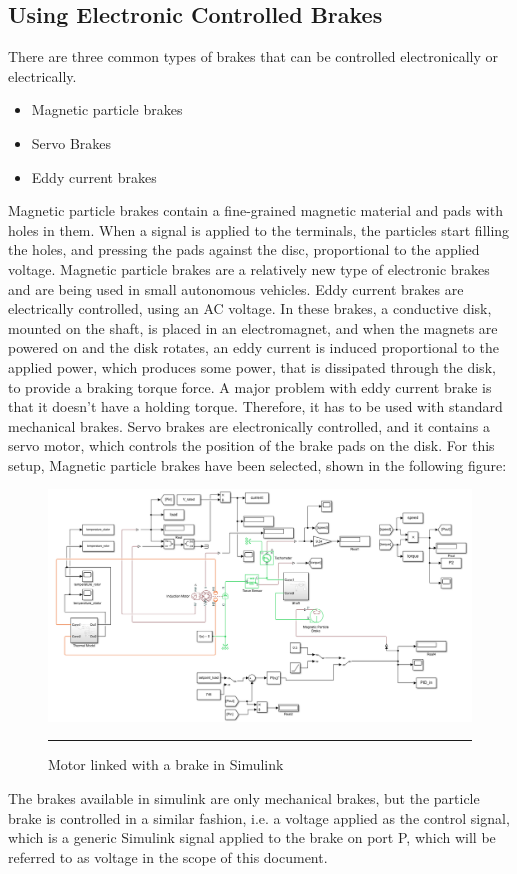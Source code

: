 \subsection{Using Electronic Controlled Brakes}
There are three common types of brakes that can be controlled electronically or electrically. 
\begin{itemize}
	\item	Magnetic particle brakes
	\item	Servo Brakes
	\item	Eddy current brakes
\end{itemize}
Magnetic particle brakes contain a fine-grained magnetic material and pads with holes in them. When a signal is applied to the terminals, the particles start filling the holes, and pressing the pads against the disc, proportional to the applied voltage. Magnetic particle brakes are a relatively new type of electronic brakes and are being used in small autonomous vehicles.
Eddy current brakes are electrically controlled, using an AC voltage. In these brakes, a conductive disk, mounted on the shaft, is placed in an electromagnet, and when the magnets are powered on and the disk rotates, an eddy current is induced proportional to the applied power, which produces some power, that is dissipated through the disk, to provide a braking torque force.  A major problem with eddy current brake is that it doesn’t have a holding torque. Therefore, it has to be used with standard mechanical brakes.
Servo brakes are electronically controlled, and it contains a servo motor, which controls the position of the brake pads on the disk. 
For this setup, Magnetic particle brakes have been selected, shown in the following figure:
\begin{figure}[htbp]
	\centering
		\includegraphics[width = 4.5in]{./Figures/MS/fig321.png}
		\rule{35em}{0.5pt}
	\caption{Motor linked with a brake in Simulink}
	\label{fig:Motor linked with a brake in Simulink}
\end{figure}
The brakes available in simulink are only mechanical brakes, but the particle brake is controlled in a similar fashion, i.e. a voltage applied as the control signal, which is a generic Simulink signal applied to the brake on port P, which will be referred to as voltage in the scope of this document.


